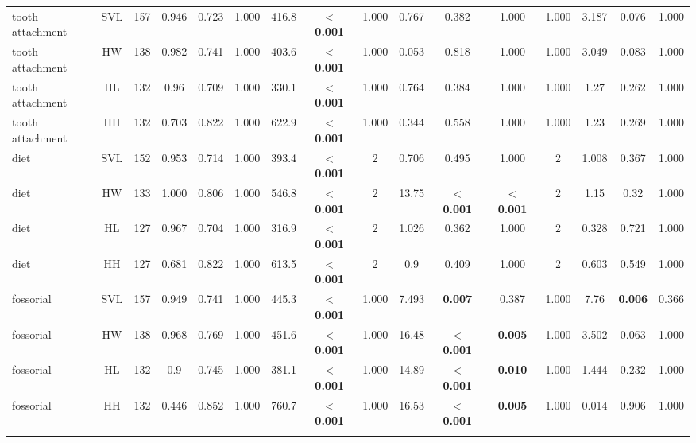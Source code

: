 \begin{longtable}{lccccccccccccccc}
\hline
tooth attachment & SVL & 157 & 0.946 & 0.723 & 1.000 & 416.8 & \textbf{$<$ 0.001} & 1.000 & 0.767 & 0.382 & 1.000 & 1.000 & 3.187 & 0.076 & 1.000 \\ 
tooth attachment & HW & 138 & 0.982 & 0.741 & 1.000 & 403.6 & \textbf{$<$ 0.001} & 1.000 & 0.053 & 0.818 & 1.000 & 1.000 & 3.049 & 0.083 & 1.000 \\ 
tooth attachment & HL & 132 & 0.96 & 0.709 & 1.000 & 330.1 & \textbf{$<$ 0.001} & 1.000 & 0.764 & 0.384 & 1.000 & 1.000 & 1.27 & 0.262 & 1.000 \\ 
tooth attachment & HH & 132 & 0.703 & 0.822 & 1.000 & 622.9 & \textbf{$<$ 0.001} & 1.000 & 0.344 & 0.558 & 1.000 & 1.000 & 1.23 & 0.269 & 1.000 \\ 
diet & SVL & 152 & 0.953 & 0.714 & 1.000 & 393.4 & \textbf{$<$ 0.001} & 2 & 0.706 & 0.495 & 1.000 & 2 & 1.008 & 0.367 & 1.000 \\ 
diet & HW & 133 & 1.000 & 0.806 & 1.000 & 546.8 & \textbf{$<$ 0.001} & 2 & 13.75 & \textbf{$<$ 0.001} & \textbf{$<$ 0.001} & 2 & 1.15 & 0.32 & 1.000 \\ 
diet & HL & 127 & 0.967 & 0.704 & 1.000 & 316.9 & \textbf{$<$ 0.001} & 2 & 1.026 & 0.362 & 1.000 & 2 & 0.328 & 0.721 & 1.000 \\ 
diet & HH & 127 & 0.681 & 0.822 & 1.000 & 613.5 & \textbf{$<$ 0.001} & 2 & 0.9 & 0.409 & 1.000 & 2 & 0.603 & 0.549 & 1.000 \\ 
fossorial & SVL & 157 & 0.949 & 0.741 & 1.000 & 445.3 & \textbf{$<$ 0.001} & 1.000 & 7.493 & \textbf{0.007} & 0.387 & 1.000 & 7.76 & \textbf{0.006} & 0.366 \\ 
fossorial & HW & 138 & 0.968 & 0.769 & 1.000 & 451.6 & \textbf{$<$ 0.001} & 1.000 & 16.48 & \textbf{$<$ 0.001} & \textbf{0.005} & 1.000 & 3.502 & 0.063 & 1.000 \\ 
fossorial & HL & 132 & 0.9 & 0.745 & 1.000 & 381.1 & \textbf{$<$ 0.001} & 1.000 & 14.89 & \textbf{$<$ 0.001} & \textbf{0.010} & 1.000 & 1.444 & 0.232 & 1.000 \\ 
fossorial & HH & 132 & 0.446 & 0.852 & 1.000 & 760.7 & \textbf{$<$ 0.001} & 1.000 & 16.53 & \textbf{$<$ 0.001} & \textbf{0.005} & 1.000 & 0.014 & 0.906 & 1.000 \\ 
\hline

\label{table_main_results}
\end{longtable}

